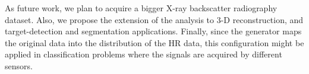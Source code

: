 \documentclass[10pt,twocolumn,letterpaper]{article}
\begin{document}
As future work, we plan to acquire a bigger X-ray backscatter radiography dataset. Also, we propose the extension of the analysis to 3-D reconstruction, and target-detection and segmentation applications. Finally, since the generator maps the original data into the distribution of the HR data, this configuration might be applied in classification problems where the signals are acquired by different sensors.

\clearpage

{\small


}
\end{document}
